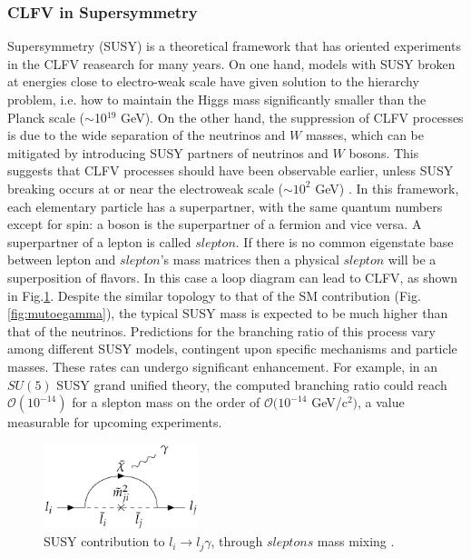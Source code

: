 \subsubsection{CLFV in Supersymmetry}\label{susy}
Supersymmetry (SUSY) is a theoretical framework that has oriented experiments in the CLFV reasearch for many years. On one hand, models with SUSY broken at energies close to electro-weak scale have given solution to the hierarchy problem, i.e. how to maintain the Higgs mass significantly smaller than the Planck scale ($\sim$10$^{19}$ GeV). On the other hand, the suppression of CLFV processes is due to the wide separation of the neutrinos and $W$ masses, which can be mitigated by introducing SUSY partners of neutrinos and $W$ bosons. This suggests that CLFV processes should have been observable earlier, unless SUSY breaking occurs at or near the electroweak scale ($\sim 10^2$ GeV) \cite{clfv_signorelli}. In this framework, each elementary particle has a superpartner,  with the same quantum numbers except for spin: a boson is the superpartner of a fermion and vice versa. A superpartner of a lepton is called $slepton$. If there is no common eigenstate base between lepton and $slepton$'s mass matrices then a physical $slepton$ will be a superposition of flavors. In this case a loop diagram can lead to CLFV, as shown in Fig.\ref{fig:susy}. Despite the similar topology to that of the SM contribution (Fig.\ref{fig:mutoegamma}), the typical SUSY mass is expected to be much higher than that of the neutrinos. Predictions for the branching ratio of this process vary among different SUSY models, contingent upon specific mechanisms and particle masses. These rates can undergo significant enhancement. For example, in an $SU(5)$ SUSY grand unified theory, the computed branching ratio could reach $\mathcal{O}(10^{-14})$ for a slepton mass on the order of $\mathcal{O}(10^{-14}$ GeV/c$^2)$, a value measurable for upcoming experiments.

\begin{figure}[!h]
\centering
\includegraphics[width =0.4\textwidth]{figures/png/Screenshot_20240218_105920.png}
\caption{SUSY contribution to $l_i \rightarrow l_j\gamma$, through $sleptons$ mass mixing \cite{universe8060299}.}
\label{fig:susy}
\end{figure}


